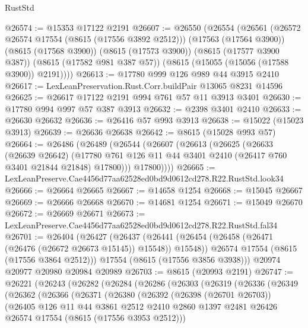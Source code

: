 \begin{lexlean}{RustStd}
\begin{coremodule}
@26574 := @15353 @17122 @2191
@26607 := @26550
    (@26554
      (@26561
        (@26572 @26574 @17554 (@8615 (@17556 @3892 @2512)))
        (@17563 (@17564 @3900))
        (@8615 (@17568 @3900))
        (@8615 (@17573 @3900))
        (@8615 (@17577 @3900 @387))
        (@8615 (@17582 @981 @387 @57))
        (@8615 (@15055 (@15056 (@17588 @3900)) @2191))))
@26613 := @17780 @999 @126 @989 @44 @3915 @2410
@26617 := LexLeanPreservation.Rust.Corr.buildPair @13065 @8231 @14596
@26625 := @26617 @17122 @2191 @994 @761 @57 @11 @3913 @3401
@26630 := @17780 @994 @997 @57 @387 @3913
@26632 := @2398 @3401 @2410
@26633 := @26630 @26632
@26636 := @26416 @57 @993 @3913
@26638 := @15022 (@15023 @3913)
@26639 := @26636 @26638
@26642 := @8615 (@15028 @993 @57)
@26664 := @26486
    (@26489
      (@26544
        (@26607
          (@26613
            (@26625
              (@26633
                (@26639 @26642)
                (@17780 @761 @126 @11 @44 @3401 @2410 (@26417 @760 @3401 @21844 @21848) @17800)))
            @17800))))
@26665 := LexLeanPreserve.Cae4456d77aa62528ed0bd9d0612cd278.R22.RustStd.look34
@26666 := @26664 @26665
@26667 := @14658 @1254
@26668 := @15045 @26667
@26669 := @26666 @26668
@26670 := @14681 @1254
@26671 := @15049 @26670
@26672 := @26669 @26671
@26673 := LexLeanPreserve.Cae4456d77aa62528ed0bd9d0612cd278.R22.RustStd.fal34
@26701 := @26404
    (@26427
      (@26437
        (@26441 (@26454 (@26458 (@26471 (@26476 (@26672 @26673 @15145)) @15548)) @15548))
        @26574
        @17554
        (@8615 (@17556 @3864 @2512)))
      @17554
      (@8615 (@17556 @3856 @3938)))
    @20974
    @20977
    @20980
    @20984
    @20989
@26703 := @8615 (@20993 @2191)
@26747 := @26221
    (@26243
      (@26282
        (@26284
          (@26286
            (@26303
              (@26319
                (@26336
                  (@26349
                    (@26362
                      (@26366
                        (@26371
                          (@26380
                            (@26392
                              (@26398 (@26701 @26703))
                              (@26405
                                @126
                                @11
                                @44
                                @3861
                                @2512
                                @2410
                                @2860
                                @1397
                                @2481
                                @26426
                                @26574
                                @17554
                                (@8615 (@17556 @3953 @2512)))

\end{coremodule}
\end{lexlean}
